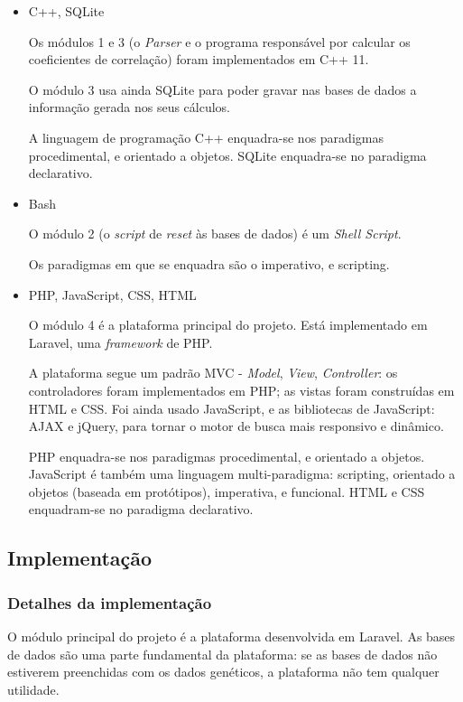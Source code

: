\begin{itemize}
    \item C++, SQLite
    
    Os módulos 1 e 3 (o \textit{Parser} e o programa responsável por calcular os coeficientes de correlação) foram implementados em C++ 11.
    
    O módulo 3 usa ainda SQLite para poder gravar nas bases de dados a informação gerada nos seus cálculos.
    
    A linguagem de programação C++ enquadra-se nos paradigmas procedimental, e orientado a objetos. SQLite enquadra-se no paradigma declarativo.
    
    \item Bash
    
    O módulo 2 (o \textit{script} de \textit{reset} às bases de dados) é um \textit{Shell Script}.
    
    Os paradigmas em que se enquadra são o imperativo, e scripting.
    
    \item PHP, JavaScript, CSS, HTML
    
    O módulo 4 é a plataforma principal do projeto. Está implementado em Laravel, uma \textit{framework} de PHP.
    
    A plataforma segue um padrão MVC - \textit{Model}, \textit{View}, \textit{Controller}: os controladores foram implementados em PHP; as vistas foram construídas em HTML e CSS. Foi ainda usado JavaScript, e as bibliotecas de JavaScript: AJAX e jQuery, para tornar o motor de busca mais responsivo e dinâmico.
    
    PHP enquadra-se nos paradigmas procedimental, e orientado a objetos. JavaScript é também uma linguagem multi-paradigma: scripting, orientado a objetos (baseada em protótipos), imperativa, e funcional. HTML e CSS enquadram-se no paradigma declarativo.
\end{itemize}

\subsection{Implementação}

\subsubsection{Detalhes da implementação}

O módulo principal do projeto é a plataforma desenvolvida em Laravel. As bases de dados são uma parte fundamental da plataforma: se as bases de dados não estiverem preenchidas com os dados genéticos, a plataforma não tem qualquer utilidade.

